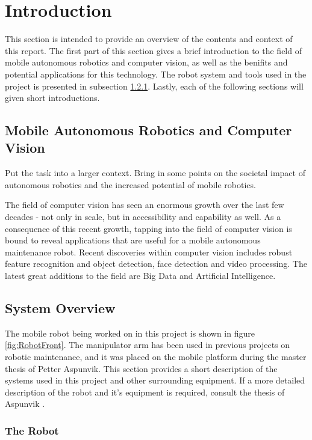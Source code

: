 \chapter{Introduction}
\label{chp:introduction} 

This section is intended to provide an overview of the contents and context of this report. The first part of this section gives a brief introduction to the field of mobile autonomous robotics and computer vision, as well as the benifits and potential applications for this technology. The robot system and tools used in the project is presented in subsection \ref{}. Lastly, each of the following sections will given short introductions.




\section{Mobile Autonomous Robotics and Computer Vision}

Put the task into a larger context. Bring in some points on the societal impact of autonomous robotics and the increased potential of mobile robotics.  

The field of computer vision has seen an enormous growth over the last few decades - not only in scale, but in accessibility and capability as well. As a consequence of this recent growth, tapping into the field of computer vision is bound to reveal applications that are useful for a mobile autonomous maintenance robot. Recent discoveries within computer vision includes robust feature recognition and object detection, face detection and video processing. The latest great additions to the field are Big Data and Artificial Intelligence.

\section{System Overview}

The mobile robot being worked on in this project is shown in figure \ref{fig:RobotFront}. The manipulator arm  has been used in previous projects on robotic maintenance, and it was placed on the mobile platform during the master thesis of Petter Aspunvik. This section provides a short description of the systems used in this project and other surrounding equipment. If a more detailed description of the robot and it's equipment is required, consult the thesis of Aspunvik \cite{aspunvik}.

\subsection{The Robot} 

